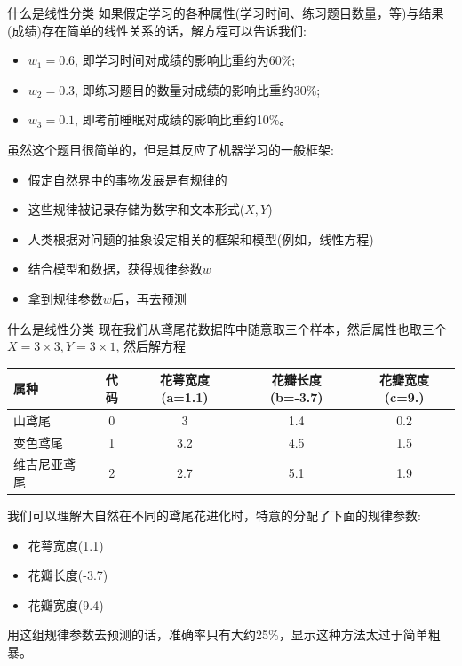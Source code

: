 \documentclass[handout]{beamer}
\begin{document}
\begin{frame}{什么是线性分类}
	如果假定学习的各种属性(学习时间、练习题目数量，等)与结果(成绩)存在简单的线性关系的话，解方程可以告诉我们:
\begin{itemize}
	\item $w_1 = 0.6$, 即学习时间对成绩的影响比重约为60\%;
	\item $w_2 = 0.3$, 即练习题目的数量对成绩的影响比重约30\%;
	\item $w_3 = 0.1$, 即考前睡眠对成绩的影响比重约10\%。
\end{itemize}

虽然这个题目很简单的，但是其反应了机器学习的一般框架:
\begin{itemize}
	\item 假定自然界中的事物发展是有规律的
	\item 这些规律被记录存储为数字和文本形式($X, Y$)
	\item 人类根据对问题的抽象设定相关的框架和模型(例如，线性方程)
	\item 结合模型和数据，获得规律参数$w$
	\item 拿到规律参数$w$后，再去预测
\end{itemize}
\end{frame}

\begin{frame}{什么是线性分类}
现在我们从鸢尾花数据阵中随意取三个样本，然后属性也取三个$X= 3 \times 3, Y = 3 \times 1$, 然后解方程
\begin{table}[H]
		\centering
{\footnotesize
		\begin{tabular}{lcccc}
		\hline 
			属种 & 代码 & 花萼宽度(a=1.1) &花瓣长度(b=-3.7) & 花瓣宽度(c=9.) \\
			\hline 
			山鸢尾 & 0 & 3 &  1.4 & 0.2 \\
			变色鸢尾 & 1 & 3.2 & 4.5  & 1.5 \\
			维吉尼亚鸢尾 & 2 & 2.7 &  5.1 & 1.9  \\
			\hline  
		\end{tabular}
}
\end{table}
我们可以理解大自然在不同的鸢尾花进化时，特意的分配了下面的规律参数:
		\begin{itemize}
			\item 花萼宽度(1.1)
			\item 花瓣长度(-3.7)
			\item 花瓣宽度(9.4)
		\end{itemize}
		用这组规律参数去预测的话，准确率只有大约25\%，显示这种方法太过于简单粗暴。
\end{frame}
\end{document}
